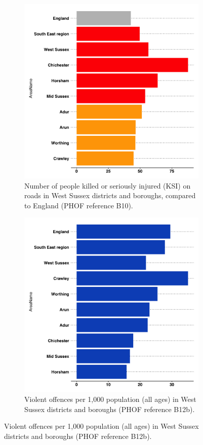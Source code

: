 \begin{figure}
    \caption[Community safety indicators in West Sussex.]{Community safety indicators in West Sussex.}\label{fig:com-safety-inds}
    \vspace*{3mm}
    \centering
    \begin{subfigure}[t]{0.45\textwidth}
        \caption[number of people killed or seriously injured (KSI) on roads per 1,000 population (all ages) over time]{Number of people killed or seriously injured (KSI) on roads in West Sussex districts and boroughs, compared to England (PHOF reference B10).}\label{fig:ksi:dabs}
        \centering
        \includegraphics[width=.7\textwidth]{images/road_accidents_rag.png}
    \end{subfigure}
    \begin{subfigure}[t]{0.45\textwidth}
        \caption[Violent offences per 1,000 population (all ages) in West Sussex districts and boroughs.]{Violent offences per 1,000 population (all ages) in West Sussex districts and boroughs (PHOF reference B12b).}\label{fig:suicidviolence:ltla}
        \centering
        \includegraphics[width=.7\textwidth]{images/violent_offences_bar.png}

\end{subfigure}
\end{figure}
